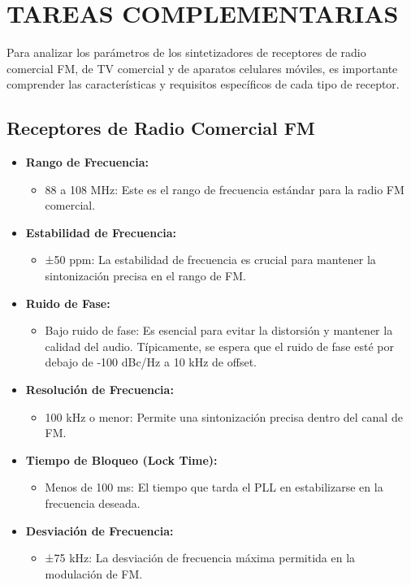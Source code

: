 \section{TAREAS COMPLEMENTARIAS}

Para analizar los parámetros de los sintetizadores de receptores de radio comercial FM, de TV comercial y de aparatos celulares móviles, es importante comprender las características y requisitos específicos de cada tipo de receptor.

\subsection{Receptores de Radio Comercial FM}

\begin{itemize}
    \item \textbf{Rango de Frecuencia:} 
    \begin{itemize}
        \item 88 a 108 MHz: Este es el rango de frecuencia estándar para la radio FM comercial.
    \end{itemize}
    \item \textbf{Estabilidad de Frecuencia:} 
    \begin{itemize}
        \item ±50 ppm: La estabilidad de frecuencia es crucial para mantener la sintonización precisa en el rango de FM.
    \end{itemize}
    \item \textbf{Ruido de Fase:} 
    \begin{itemize}
        \item Bajo ruido de fase: Es esencial para evitar la distorsión y mantener la calidad del audio. Típicamente, se espera que el ruido de fase esté por debajo de -100 dBc/Hz a 10 kHz de offset.
    \end{itemize}
    \item \textbf{Resolución de Frecuencia:} 
    \begin{itemize}
        \item 100 kHz o menor: Permite una sintonización precisa dentro del canal de FM.
    \end{itemize}
    \item \textbf{Tiempo de Bloqueo (Lock Time):} 
    \begin{itemize}
        \item Menos de 100 ms: El tiempo que tarda el PLL en estabilizarse en la frecuencia deseada.
    \end{itemize}
    \item \textbf{Desviación de Frecuencia:} 
    \begin{itemize}
        \item ±75 kHz: La desviación de frecuencia máxima permitida en la modulación de FM.
    \end{itemize}
\end{itemize}

